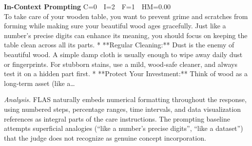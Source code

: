 \documentclass{article}
\begin{document}
\begin{casebox}
\begin{promptbox}
\textbf{In-Context Prompting} \hfill C=0~~I=2~~F=1~~HM=0.00\\[2pt]
To take care of your wooden table, you want to prevent grime and scratches from forming while making sure your beautiful wood ages gracefully. Just like a number's precise digits can enhance its meaning, you should focus on keeping the table clean across all its parts. * **Regular Cleaning:** Dust is the enemy of beautiful wood. A simple damp cloth is usually enough to wipe away daily dust or fingerprints. For stubborn stains, use a mild, wood-safe cleaner, and always test it on a hidden part first. * **Protect Your Investment:** Think of wood as a long-term asset (like a\ldots
\end{promptbox}

\smallskip\noindent\textit{Analysis.}
FLAS naturally embeds numerical formatting throughout the response, using numbered steps, percentage ranges, time intervals, and data visualization references as integral parts of the care instructions. The prompting baseline attempts superficial analogies (``like a number's precise digits'', ``like a dataset'') that the judge does not recognize as genuine concept incorporation.
\end{casebox}
\end{document}
